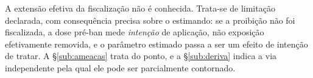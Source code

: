 A extensão efetiva da fiscalização não é conhecida. Trata-se de limitação
declarada, com consequência precisa sobre o estimando: se a proibição não foi
fiscalizada, a dose pré-ban mede \emph{intenção} de aplicação, não exposição
efetivamente removida, e o parâmetro estimado passa a ser um efeito de intenção
de tratar. A §\ref{sub:ameacas} trata do ponto, e a §\ref{sub:deriva} indica a
via independente pela qual ele pode ser parcialmente contornado.
